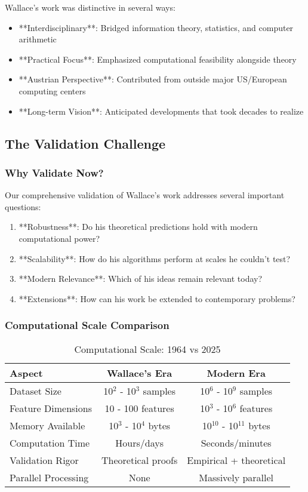 Wallace's work was distinctive in several ways:

\begin{itemize}
    \item **Interdisciplinary**: Bridged information theory, statistics, and computer arithmetic
    \item **Practical Focus**: Emphasized computational feasibility alongside theory
    \item **Austrian Perspective**: Contributed from outside major US/European computing centers
    \item **Long-term Vision**: Anticipated developments that took decades to realize
\end{itemize}

\subsection{The Validation Challenge}

\subsubsection{Why Validate Now?}

Our comprehensive validation of Wallace's work addresses several important questions:

\begin{enumerate}
    \item **Robustness**: Do his theoretical predictions hold with modern computational power?
    \item **Scalability**: How do his algorithms perform at scales he couldn't test?
    \item **Modern Relevance**: Which of his ideas remain relevant today?
    \item **Extensions**: How can his work be extended to contemporary problems?
\end{enumerate}

\subsubsection{Computational Scale Comparison}

\begin{table}[h!]
\centering
\caption{Computational Scale: 1964 vs 2025}
\begin{tabular}{@{}lcc@{}}
\toprule
Aspect & Wallace's Era & Modern Era \\
\midrule
Dataset Size & 10$^2$ - 10$^3$ samples & 10$^6$ - 10$^9$ samples \\
Feature Dimensions & 10 - 100 features & 10$^3$ - 10$^6$ features \\
Memory Available & 10$^3$ - 10$^4$ bytes & 10$^10$ - 10$^11$ bytes \\
Computation Time & Hours/days & Seconds/minutes \\
Validation Rigor & Theoretical proofs & Empirical + theoretical \\
Parallel Processing & None & Massively parallel \\
\midrule
\end{tabular}
\end{table}

